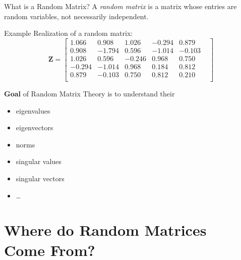 \documentclass[10pt, aspectratio=169]{beamer}
\begin{document}
\begin{frame}{What is a Random Matrix?}
    A \emph{random matrix} is a matrix whose entries are random variables, not necessarily independent.
    
    \pause\begin{exampleblock}{Example}
    Realization of a random matrix:
    $$
    \boldsymbol{Z} = \begin{bmatrix}
1.066 &  0.908 &  1.026 & -0.294 &  0.879\\
        0.908 & -1.794 &  0.596 & -1.014 & -0.103\\
       1.026 &  0.596 & -0.246 &  0.968 &  0.750 &\\
       -0.294 & -1.014 &  0.968 &  0.184&  0.812 & \\
       0.879 &  -0.103 &   0.750 &   0.812 &   0.210  & \\
\end{bmatrix}
    $$
    \end{exampleblock}
    
    \pause
    {\bfseries Goal} of Random Matrix Theory is to understand their
    \begin{multicols}{3}
    \begin{itemize}
    \item eigenvalues
    \item eigenvectors
    \item norms
    \item singular values
    \item singular vectors
    \item \ldots
    \end{itemize}
    \end{multicols}
\end{frame}



\section{Where do Random Matrices\\ Come From?}
\end{document}
